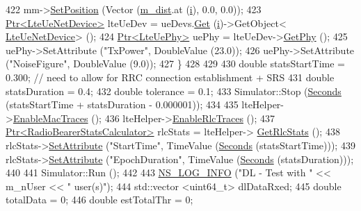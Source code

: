 \begin{DoxyCode}
422       mm->\hyperlink{classns3_1_1MobilityModel_ac584b3d5a309709d2f13ed6ada1e7640}{SetPosition} (Vector (\hyperlink{classLenaFdBetFfMacSchedulerTestCase2_a9592e66a8457fdae6ec5903bd0038948}{m\_dist}.at (\hyperlink{bernuolliDistribution_8m_a6f6ccfcf58b31cb6412107d9d5281426}{i}), 0.0, 0.0));
423       \hyperlink{classns3_1_1Ptr}{Ptr<LteUeNetDevice>} lteUeDev = ueDevs.\hyperlink{classns3_1_1NetDeviceContainer_a677d62594b5c9d2dea155cc5045f4d0b}{Get} (\hyperlink{bernuolliDistribution_8m_a6f6ccfcf58b31cb6412107d9d5281426}{i})->GetObject<
      \hyperlink{classns3_1_1LteUeNetDevice}{LteUeNetDevice}> ();
424       \hyperlink{classns3_1_1Ptr}{Ptr<LteUePhy>} uePhy = lteUeDev->\hyperlink{classns3_1_1LteUeNetDevice_a2a9940a1e457a8bf3dae87fed4199c7a}{GetPhy} ();
425       uePhy->SetAttribute (\textcolor{stringliteral}{"TxPower"}, DoubleValue (23.0));
426       uePhy->SetAttribute (\textcolor{stringliteral}{"NoiseFigure"}, DoubleValue (9.0));
427     \}
428 
429 
430   \textcolor{keywordtype}{double} statsStartTime = 0.300; \textcolor{comment}{// need to allow for RRC connection establishment + SRS}
431   \textcolor{keywordtype}{double} statsDuration = 0.4;
432   \textcolor{keywordtype}{double} tolerance = 0.1;
433   Simulator::Stop (\hyperlink{group__timecivil_ga33c34b816f8ff6628e33d5c8e9713b9e}{Seconds} (statsStartTime + statsDuration - 0.000001));
434 
435   lteHelper->\hyperlink{classns3_1_1LteHelper_affa3a12841520407d3662417fe41863d}{EnableMacTraces} ();
436   lteHelper->\hyperlink{classns3_1_1LteHelper_abadfdd04d30b261e9b6f0846b4784928}{EnableRlcTraces} ();
437   \hyperlink{classns3_1_1Ptr}{Ptr<RadioBearerStatsCalculator>} rlcStats = lteHelper->
      \hyperlink{classns3_1_1LteHelper_a6eb438ccf69642e3863adea4991fa2ca}{GetRlcStats} ();
438   rlcStats->\hyperlink{classns3_1_1ObjectBase_ac60245d3ea4123bbc9b1d391f1f6592f}{SetAttribute} (\textcolor{stringliteral}{"StartTime"}, TimeValue (\hyperlink{group__timecivil_ga33c34b816f8ff6628e33d5c8e9713b9e}{Seconds} (statsStartTime)));
439   rlcStats->\hyperlink{classns3_1_1ObjectBase_ac60245d3ea4123bbc9b1d391f1f6592f}{SetAttribute} (\textcolor{stringliteral}{"EpochDuration"}, TimeValue (\hyperlink{group__timecivil_ga33c34b816f8ff6628e33d5c8e9713b9e}{Seconds} (statsDuration)));
440 
441   Simulator::Run ();
442 
443   \hyperlink{group__logging_gafbd73ee2cf9f26b319f49086d8e860fb}{NS\_LOG\_INFO} (\textcolor{stringliteral}{"DL - Test with "} << m\_nUser << \textcolor{stringliteral}{" user(s)"});
444   std::vector <uint64\_t> dlDataRxed;
445   \textcolor{keywordtype}{double} totalData = 0;
446   \textcolor{keywordtype}{double} estTotalThr = 0;

\end{DoxyCode}
